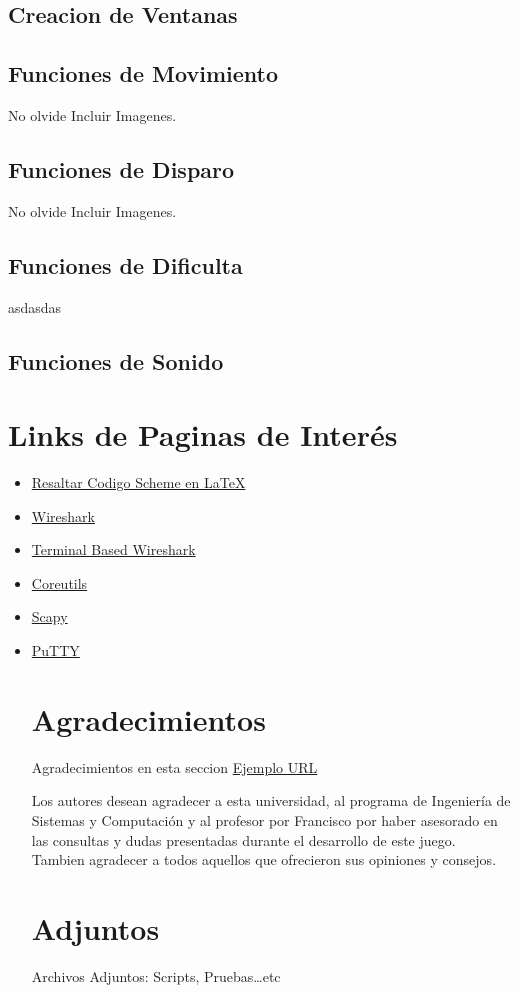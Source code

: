 \documentclass[a4paper]{article} %
\begin{document}
\subsection{Creacion de Ventanas}

\subsection{Funciones de Movimiento}
No olvide Incluir Imagenes.

\subsection{Funciones de Disparo}
No olvide Incluir Imagenes.
\subsection{Funciones de Dificulta}
asdasdas
\subsection{Funciones de Sonido}
\clearpage
\newpage
\section{Links de Paginas de Interés \label{Herramientas}}
\begin{itemize}
\item \href{https://github.com/stuhlmueller/scheme-listings}{Resaltar Codigo Scheme en \LaTeX}
\item \href{www.wireshark.org}{Wireshark}
\item \href{www.wireshark.org}{Terminal Based Wireshark}
\item \href{http://www.gnu.org/software/coreutils/}{Coreutils}
\item \href{http://www.secdev.org/projects/scapy/}{Scapy}
\item \href{http://www.chiark.greenend.org.uk/~sgtatham/putty/}{PuTTY}
\clearpage
\newpage
\section{Agradecimientos}
Agradecimientos en esta seccion \href{http://www.ejemplourl.org}{Ejemplo URL} 

Los autores desean agradecer a esta universidad, al programa de Ingeniería de Sistemas y Computación y al profesor por Francisco por haber asesorado en las consultas y dudas presentadas durante el desarrollo de este juego. Tambien agradecer a todos aquellos que ofrecieron sus opiniones y consejos.
\clearpage
\newpage
\section{Adjuntos}
Archivos Adjuntos: Scripts, Pruebas\ldots etc 


\end{itemize}
\end{document}
